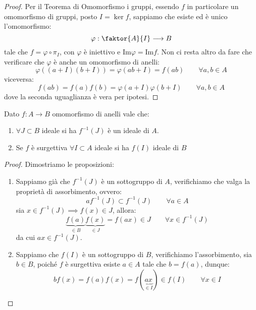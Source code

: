 \documentclass[11pt]{scrartcl}
\begin{document}
\begin{proof}
    Per il Teorema di Omomorfismo i gruppi, essendo $f$ in particolare un omomorfismo di gruppi, posto $I = \ker f$, sappiamo che
    esiste ed è unico l'omomorfismo:
        \[ \varphi : \faktor{A}{I} \longrightarrow B
            \]
    tale che $f = \varphi \circ \pi_I$, con $\varphi$ è iniettivo e $\text{Im} \varphi = \text{Im} f$. Non ci resta altro da fare che verificare che $\varphi$ è 
    anche un omomorfismo di anelli:
        \[ \varphi((a+I)(b+I)) = \varphi(ab+I) = f(ab) \qquad \forall a,b \in A
            \]
    viceversa:
        \[ f(ab) = f(a)f(b) = \varphi(a+I)\varphi(b+I) \qquad \forall a,b \in A
            \]
    dove la seconda uguaglianza è vera per ipotesi.
\end{proof}

\begin{lemma}
    \label{2.35}
    Dato $f : A \longrightarrow B$ omomorfismo di anelli vale che:
    \begin{enumerate}[(1)]
        \item $\forall J \subset B$ ideale si ha $f^{-1}(J)$ è un ideale di $A$.
        \item Se $f$ è surgettiva $\forall I \subset A$ ideale si ha $f(I)$ ideale di $B$
    \end{enumerate}
\end{lemma}

\begin{proof}
    Dimostriamo le proposizioni:
    \begin{enumerate}[(1)]
        \item Sappiamo già che $f^{-1}(J)$ è un sottogruppo di $A$, verifichiamo che valga la proprietà di assorbimento, ovvero:
            \[ af^{-1}(J) \subset f^{-1}(J) \qquad \forall a \in A
                \]
            sia $x \in f^{-1}(J) \implies f(x) \in J$, allora:
            \[ \underbrace{f(a)}_{\in B}\underbrace{f(x)}_{\in J} = f(ax) \in J \qquad \forall x \in f^{-1}(J)
                \]
            da cui $ax \in f^{-1}(J)$.
        \item Sappiamo che $f(I)$ è un sottogruppo di $B$, verifichiamo l'assorbimento, sia $b \in B$, poiché $f$ è surgettiva esiste $a \in A$ tale che $b = f(a)$, dunque:
            \[ bf(x) = f(a)f(x) = f(\underbrace{ax}_{\in I}) \in f(I) \qquad \forall x \in I
                \]
    \end{enumerate}
\end{proof}
\end{document}

